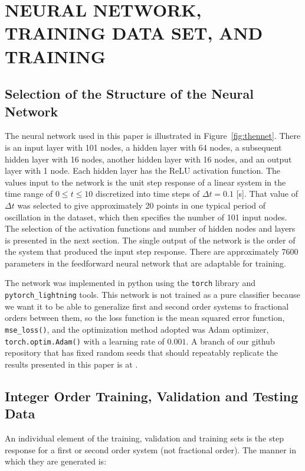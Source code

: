 \section{NEURAL NETWORK, TRAINING DATA SET, AND TRAINING}
\label{sec:network}

\subsection{Selection of the Structure of the Neural Network}

  The neural network used in this paper is illustrated in
  Figure~\ref{fig:thennet}. There is an input layer with 101 nodes, a hidden
  layer with 64 nodes, a subsequent hidden layer with 16 nodes, another hidden
  layer with 16 nodes, and an output layer with 1 node. Each hidden layer has
  the ReLU activation function. The values input to the network is the unit step
  response of a linear system in the time range of $0 \leq t \leq 10$
  discretized into time steps of $\Delta t = 0.1$ [s]. That value of $\Delta t$
  was selected to give approximately 20 points in one typical period of
  oscillation in the dataset, which then specifies the number of 101 input
  nodes.  The selection of the activation functions and number of hidden nodes
  and layers is presented in the next section. The single output of the network
  is the order of the system that produced the input step response. There are
  approximately 7600 parameters in the feedforward neural network that are
  adaptable for training. 

  The network was implemented in python using the \texttt{torch} library and
  \texttt{pytorch\_lightning} tools. This network is not trained as a pure
  classifier because we want it to be able to generalize first and second order
  systems to fractional orders between them, so the loss function is the mean
  squared error function, \texttt{mse\_loss()}, and the optimization method
  adopted was Adam optimizer, \texttt{torch.optim.Adam()} with a learning rate
  of $0.001$. A branch of our github repository that has fixed random seeds that
  should repeatably replicate the results presented in this paper is at
  \cite{Goodwine_Integer_trained_neural}.

\subsection{Integer Order Training, Validation and Testing Data}

  An individual element of the training, validation and training sets is the
  step response for a first or second order system (not fractional order). The
  manner in which they are generated is:

